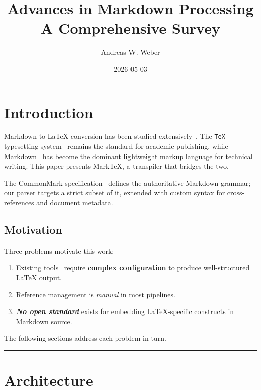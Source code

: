 \documentclass{article}
\title{Advances in Markdown Processing\\[0.5em]{\normalfont\large A Comprehensive Survey}}
\author{Andreas W. Weber}
\date{2026-05-03}
\begin{document}
\maketitle

\tableofcontents

\listoffigures

\listoftables

\lstlistoflistings

\section{Introduction}

Markdown-to-LaTeX conversion has been studied extensively~\cite{knuth1986texbook}. The \texttt{TeX} typesetting system~\cite{lamport1994latex} remains the standard for academic publishing, while Markdown~\cite{gruber2004markdown} has become the dominant lightweight markup language for technical writing. This paper presents MarkTeX, a transpiler that bridges the two.

The CommonMark specification~\cite{commonmark2021spec} defines the authoritative Markdown grammar; our parser targets a strict subset of it, extended with custom syntax for cross-references and document metadata.

\subsection{Motivation}

Three problems motivate this work:

\begin{enumerate}
  \item Existing tools~\cite{knuth1986texbook} require \textbf{complex configuration} to produce well-structured LaTeX output.
  \item Reference management is \textit{manual} in most pipelines.
  \item \textbf{\textit{No open standard}} exists for embedding LaTeX-specific constructs in Markdown source.
\end{enumerate}

The following sections address each problem in turn.


\noindent\rule{\linewidth}{0.4pt}

\section{Architecture}
\end{document}

